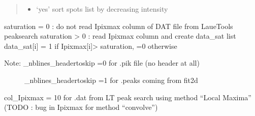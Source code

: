 \documentclass[letterpaper,10pt,english]{sphinxmanual}
\begin{document}
\begin{fulllineitems}
\begin{quote}
\begin{description}
\begin{itemize}
\item {} 
 \textendash{} ‘yes’ sort spots list by decreasing intensity

\end{itemize}

\end{description}\end{quote}

saturation = 0 : do not read Ipixmax column of DAT file from LaueTools peaksearch
saturation \textgreater{} 0 : read Ipixmax column and create data\_sat list
data\_sat{[}i{]} = 1 if Ipixmax{[}i{]}\textgreater{} saturation, =0 otherwise
\begin{description}
\item[{Note: \_nblines\_headertoskip =0 for .pik file (no header at all)}] \leavevmode
\_nblines\_headertoskip =1 for .peaks coming from fit2d

\end{description}

col\_Ipixmax = 10 for .dat from LT peak search using method “Local Maxima”
(TODO : bug in Ipixmax for method “convolve”)

\end{fulllineitems}

\end{document}
